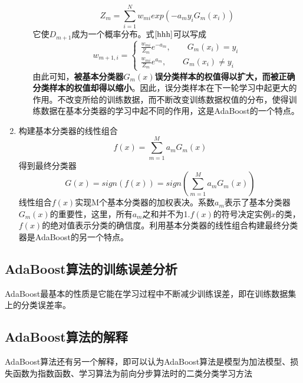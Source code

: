 \begin{enumerate}[(1)]
\begin{enumerate}[a.]
\begin{equation}
		Z_m = \sum_{i=1}^N w_{mi}exp(-a_m y_iG_m(x_i))
		\end{equation}
		它使$D_{m+1}$成为一个概率分布。式$\ref{hhh}$可以写成
		\begin{equation}
			w_{m+1,i}=
			\begin{cases}
			\frac{w_{mi}}{Z_m}e^{-a_m},\qquad G_m(x_i)=y_i\\
			\frac{w_{mi}}{Z_m}e^{a_m},\qquad G_m(x_i)\ne y_i
			\end{cases}
		\end{equation}
		由此可知，\textbf{被基本分类器$G_m(x)$误分类样本的权值得以扩大，而被正确分类样本的权值却得以缩小}。因此，误分类样本在下一轮学习中起更大的作用。不改变所给的训练数据，而不断改变训练数据权值的分布，使得训练数据在基本分类器的学习中起不同的作用，这是AdaBoost的一个特点。
	\end{enumerate}
	\item 构建基本分类器的线性组合
	\begin{equation}
		f(x) = \sum_{m=1}^Ma_mG_m(x)
	\end{equation}
	得到最终分类器
	\begin{equation}
		G(x) = sign(f(x)) = sign\left( \sum_{m=1}^Ma_mG_m(x) \right)
	\end{equation}
	线性组合$f(x)$实现M个基本分类器的加权表决。系数$a_m$表示了基本分类器$G_m(x)$的重要性，这里，所有$a_m$之和并不为1.$f(x)$的符号决定实例$x$的类，$f(x)$的绝对值表示分类的确信度。利用基本分类器的线性组合构建最终分类器是AdaBoost的另一个特点。
\end{enumerate}

\subsection*{AdaBoost算法的训练误差分析}
AdaBoost最基本的性质是它能在学习过程中不断减少训练误差，即在训练数据集上的分类误差率。
\subsection*{AdaBoost算法的解释}
AdaBoost算法还有另一个解释，即可以认为AdaBoost算法是模型为加法模型、损失函数为指数函数、学习算法为前向分步算法时的二类分类学习方法